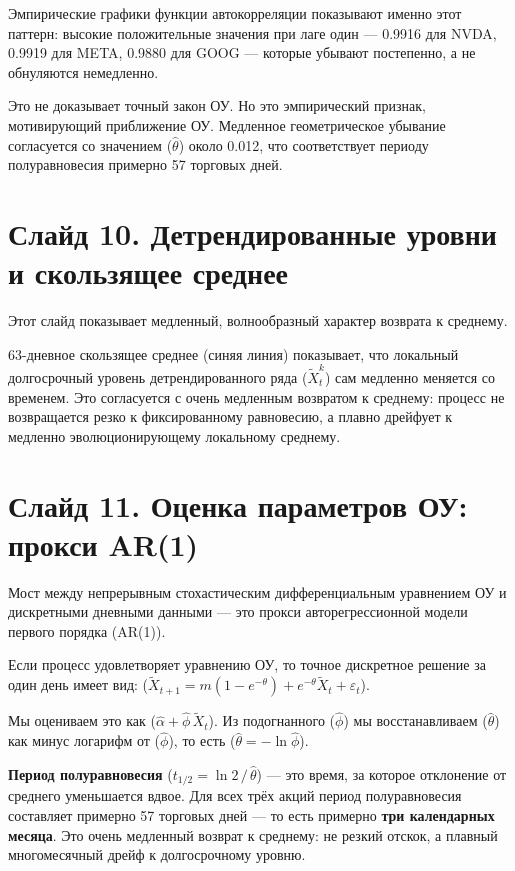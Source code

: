 \documentclass[12pt,a4paper]{article}
\begin{document}
Эмпирические графики функции автокорреляции показывают именно этот паттерн:
высокие положительные значения при лаге один ---
0.9916 для NVDA, 0.9919 для META, 0.9880 для GOOG ---
которые убывают постепенно, а не обнуляются немедленно.

Это не доказывает точный закон ОУ.
Но это эмпирический признак, мотивирующий приближение ОУ.
Медленное геометрическое убывание согласуется со значением ($\hat\theta$)
около 0.012, что соответствует периоду полуравновесия примерно 57 торговых дней.

\section{Слайд 10. Детрендированные уровни и скользящее среднее}

Этот слайд показывает медленный, волнообразный характер возврата к среднему.

63-дневное скользящее среднее (синяя линия) показывает, что локальный
долгосрочный уровень детрендированного ряда ($\widetilde{X}_t^k$)
сам медленно меняется со временем.
Это согласуется с очень медленным возвратом к среднему:
процесс не возвращается резко к фиксированному равновесию,
а плавно дрейфует к медленно эволюционирующему локальному среднему.

\section{Слайд 11. Оценка параметров ОУ: прокси AR(1)}

Мост между непрерывным стохастическим дифференциальным уравнением ОУ
и дискретными дневными данными --- это прокси авторегрессионной модели первого порядка (AR(1)).

Если процесс удовлетворяет уравнению ОУ, то точное дискретное решение
за один день имеет вид:
($\widetilde{X}_{t+1} = m(1-e^{-\theta}) + e^{-\theta}\widetilde{X}_t + \varepsilon_t$).

Мы оцениваем это как ($\hat\alpha + \hat\phi\,\widetilde{X}_t$).
Из подогнанного ($\hat\phi$)
мы восстанавливаем ($\hat\theta$) как минус логарифм от ($\hat\phi$),
то есть ($\hat\theta = -\ln\hat\phi$).

\textbf{Период полуравновесия} ($t_{1/2} = \ln 2\,/\,\hat\theta$) ---
это время, за которое отклонение от среднего уменьшается вдвое.
Для всех трёх акций период полуравновесия составляет примерно 57 торговых дней ---
то есть примерно \textbf{три календарных месяца}.
Это очень медленный возврат к среднему:
не резкий отскок, а плавный многомесячный дрейф к долгосрочному уровню.
\end{document}
